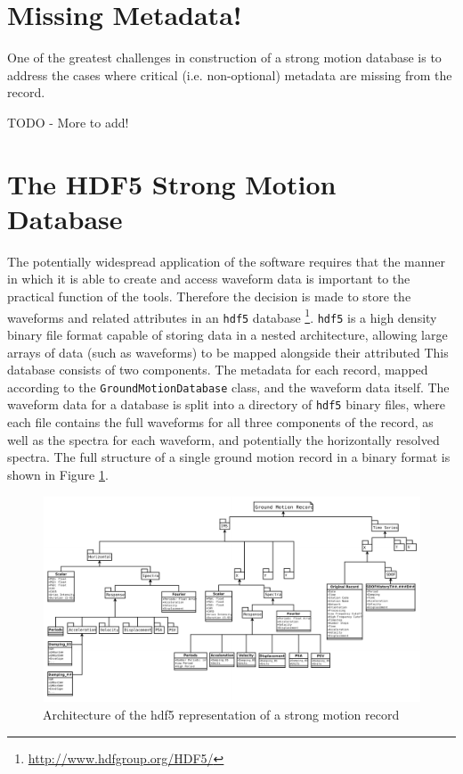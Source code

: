\section{Missing Metadata!}
\label{sec:missing_metadata}

One of the greatest challenges in construction of a strong motion database is to address the cases where critical (i.e. non-optional) metadata are missing from the record. 

TODO - More to add!

\section{The HDF5 Strong Motion Database}
\label{sec:hdf5}

The potentially widespread application of the software requires that the manner in which it is able to create and access waveform data is important to the practical function of the tools. Therefore the decision is made to store the waveforms and related attributes in an \verb=hdf5= database \footnote{\href{http://www.hdfgroup.org/HDF5/}{http://www.hdfgroup.org/HDF5/}}. \verb=hdf5= is a high density binary file format capable of storing data in a nested architecture, allowing large arrays of data (such as waveforms) to be mapped alongside their attributed This database consists of two components. The metadata for each record, mapped according to the \verb=GroundMotionDatabase= class, and the waveform data itself. The waveform data for a database is split into a directory of \verb=hdf5= 
binary files, where each file contains the full waveforms for all three components of the record, as well as the spectra for each waveform, and potentially the horizontally resolved spectra. The full structure of a single ground motion record in a binary format is shown in Figure \ref{fig:sm_hdf5_model}.

\begin{figure}
	\centering
		\includegraphics[width=\textwidth]{./figures/database/sm_database_architecture.pdf}
	\caption{Architecture of the hdf5 representation of a strong motion record}
	\label{fig:sm_hdf5_model}
\end{figure}

